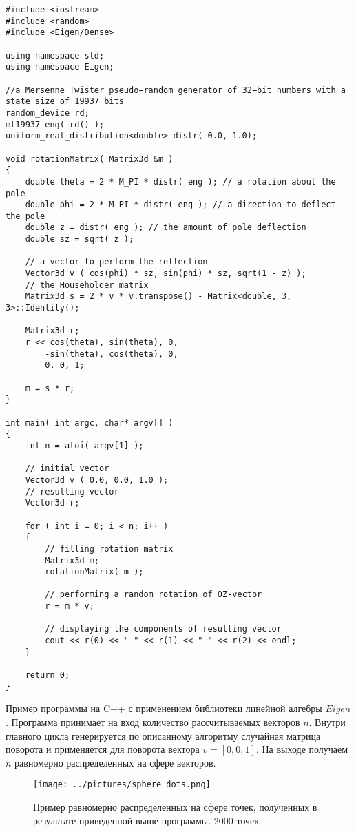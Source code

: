 \begin{lstlisting}
#include <iostream>
#include <random>
#include <Eigen/Dense>

using namespace std;
using namespace Eigen;

//a Mersenne Twister pseudo−random generator of 32−bit numbers with a state size of 19937 bits 
random_device rd;
mt19937 eng( rd() );
uniform_real_distribution<double> distr( 0.0, 1.0);

void rotationMatrix( Matrix3d &m )
{
	double theta = 2 * M_PI * distr( eng ); // a rotation about the pole
	double phi = 2 * M_PI * distr( eng ); // a direction to deflect the pole 
	double z = distr( eng ); // the amount of pole deflection	 
	double sz = sqrt( z );

	// a vector to perform the reflection
	Vector3d v ( cos(phi) * sz, sin(phi) * sz, sqrt(1 - z) );
	// the Householder matrix
	Matrix3d s = 2 * v * v.transpose() - Matrix<double, 3, 3>::Identity();

	Matrix3d r;
   	r << cos(theta), sin(theta), 0,
		-sin(theta), cos(theta), 0,
		0, 0, 1;
	
	m = s * r;
}

int main( int argc, char* argv[] )
{
	int n = atoi( argv[1] );
	
	// initial vector
	Vector3d v ( 0.0, 0.0, 1.0 );
	// resulting vector
	Vector3d r;

	for ( int i = 0; i < n; i++ )
	{
		// filling rotation matrix
    	Matrix3d m;
    	rotationMatrix( m );

		// performing a random rotation of OZ-vector
		r = m * v;
		
		// displaying the components of resulting vector
		cout << r(0) << " " << r(1) << " " << r(2) << endl;
	}

    return 0;
}
\end{lstlisting}

Пример программы на C++ с применением библиотеки линейной алгебры $Eigen$. Программа принимает на вход количество рассчитываемых векторов $n$. Внутри главного цикла генерируется по описанному алгоритму случайная матрица поворота и применяется для поворота вектора $v = \left[ 0, 0, 1 \right]$. На выходе получаем $n$ равномерно распределенных на сфере векторов.

\begin{figure}[ht!]
		\texttt{[image: ../pictures/sphere\_dots.png]}
		\caption{Пример равномерно распределенных на сфере точек, полученных в результате приведенной выше программы. 2000 точек.}
\end{figure}


